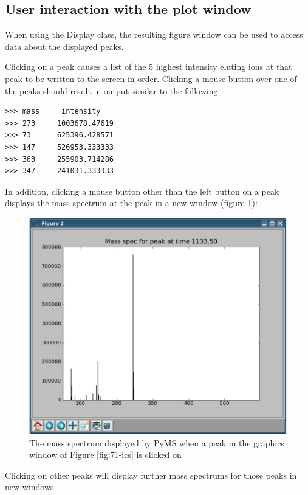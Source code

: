 \subsection{User interaction with the plot window}

When using the Display class, the resulting figure window can be used to
access data about the displayed peaks.

Clicking on a peak causes a list of the 5 highest intensity eluting ions
at that peak to be written to the screen in order.  Clicking a mouse
 button over one of the peaks should result in output similar to the
following:

\begin{verbatim}
>>> mass     intensity
>>> 273     1003678.47619
>>> 73      625396.428571
>>> 147     526953.333333
>>> 363     255903.714286
>>> 347     241031.333333
\end{verbatim}

In addition, clicking a mouse button other than the left button on a peak
displays the mass spectrum at the peak in a new window (figure \ref{fig:71-spec}):

\begin{figure}
  \begin{center}
    \includegraphics[scale=0.33]{graphics/chapter07/test-71-spec.eps}
  \end{center}
  \caption{The mass spectrum displayed by PyMS when a peak in the
  graphics window of Figure \ref{fig:71-ics} is clicked on}
  \label{fig:71-spec}
\end{figure}

Clicking on other peaks will display further mass spectrums for those peaks
in new windows.

